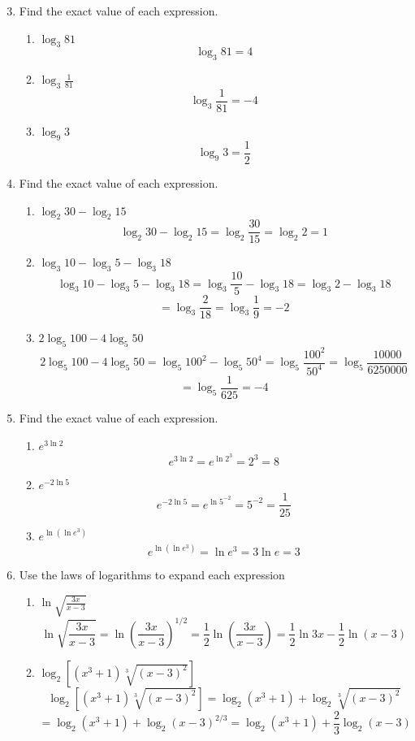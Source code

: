 \documentclass[12pt]{article}
\begin{document}
\begin{enumerate}
\setcounter{enumi}{2}
    \item Find the exact value of each expression.
    \begin{enumerate}
        \item \(\log_3 81\)
        \[\log_3 81 = 4\]
        \item \(\log_3 \frac{1}{81}\)
        \[\log_3 \frac{1}{81} = -4\]
        \item \(\log_9 3\)
        \[\log_9 3 = \frac{1}{2}\]
    \end{enumerate}

\setcounter{enumi}{4}
    \item Find the exact value of each expression.
    \begin{enumerate}
        \item \(\log_2 30 - \log_2 15\)
        \[\log_2 30 - \log_2 15 = \log_2 \frac{30}{15} = \log_2 2 = 1\]
        \item \(\log_3 10 - \log_3 5 - \log_3 18\)
        \[\log_3 10 - \log_3 5 - \log_3 18 = \log_3 \frac{10}{5} - \log_3 18 = \log_3 2 - \log_3 18\]
        \[ = \log_3 \frac{2}{18} = \log_3 \frac{1}{9} = -2\]
        \item \(2\log_5 100 - 4\log_5 50\)
        \[2\log_5 100 - 4\log_5 50 = \log_5 100^2 - \log_5 50^4 = \log_5 \frac{100^2}{50^4} = \log_5 \frac{10000}{6250000}\]
        \[= \log_5 \frac{1}{625} = -4\]
    \end{enumerate}

    \item Find the exact value of each expression.
    \begin{enumerate}
        \item \(e^{3\ln 2}\)
        \[e^{3\ln 2} = e^{\ln 2^3} = 2^3 = 8\]
        \item \(e^{-2\ln 5}\)
        \[e^{-2\ln 5} = e^{\ln 5^{-2}} = 5^{-2} = \frac{1}{25}\]
        \item \(e^{\ln (\ln e^3)}\)
        \[e^{\ln (\ln e^3)} = \ln e^3 = 3\ln e = 3\]
    \end{enumerate}

\setcounter{enumi}{7}
    \item Use the laws of logarithms to expand each expression
    \begin{enumerate}
        \item \(\ln \sqrt{\frac{3x}{x-3}}\)
        \[\ln \sqrt{\frac{3x}{x-3}} = \ln (\frac{3x}{x-3})^{1/2} = \frac{1}{2} \ln (\frac{3x}{x-3}) = \frac{1}{2} \ln 3x - \frac{1}{2} \ln (x-3)\]
        \item \(\log_2 [(x^3 + 1)\sqrt[3]{(x-3)^2}]\)
        \[\log_2 [(x^3 + 1)\sqrt[3]{(x-3)^2}] = \log_2 (x^3 + 1) + \log_2 \sqrt[3]{(x-3)^2} \]
        \[= \log_2 (x^3 + 1) + \log_2 (x-3)^{2/3} = \log_2 (x^3 + 1) + \frac{2}{3}\log_2 (x-3)\]
    \end{enumerate}


\end{enumerate}
\end{document}
